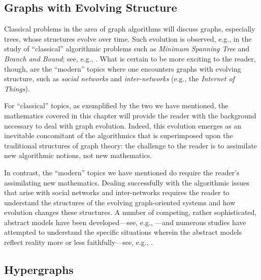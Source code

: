 \cite{RosenbergH01}



\subsection{Graphs with Evolving Structure}
\label{sec:graph-evolve}

Classical problems in the area of graph algorithms will discuss
graphs, especially trees, whose structures evolve over time.  Such
evolution is observed, e.g., in the study of ``classical'' algorithmic
problems such as {\it Minimum Spanning Tree} and {\it Branch and
  Bound}; see, e.g., \cite{CLRS}.  What is certain to be more exciting
to the reader, though, are the ``modern'' topics where one encounters
graphs with evolving structure, such as {\it social networks} and {\it
  inter-networks} (e.g., the {\it Internet of Things}).

For ``classical'' topics, as exemplified by the two we have mentioned,
the mathematics covered in this chapter will provide the reader with
the background necessary to deal with graph evolution.  Indeed, this
evolution emerges as an inevitable concomitant of the algorithmics
that is superimposed upon the traditional structures of graph theory:
the challenge to the reader is to assimilate new algorithmic notions,
not new mathematics.

In contrast, the ``modern'' topics we have mentioned do require the
reader's assimilating new mathematics.  Dealing successfully with the
algorithmic issues that arise with social networks and inter-networks
requires the reader to understand the structures of the evolving
graph-oriented systems and how evolution changes these structures.  A
number of competing, rather sophisticated, abstract models have been
developed---see, e.g.,
\cite{AielloCL00,BarabasiA99,Bollobas85,ChenCGJSW}---and numerous
studies have attempted to understand the specific situations wherein
the abstract models reflect reality more or less faithfully---see, e.g.,
\cite{BuT02,FaloutsosFF99,JaiswalRT04,TangmunarunkitGJSW02,ZeguraCD97}.


\subsection{Hypergraphs}
\label{sec:hypergraphs}

